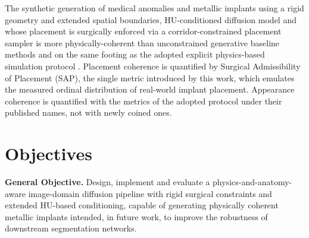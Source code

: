 \documentclass[9pt]{extarticle}
\begin{document}
The synthetic generation of medical anomalies and metallic implants using a rigid geometry and extended spatial boundaries, HU-conditioned diffusion model and whose placement is surgically enforced via a corridor-constrained placement sampler is more physically-coherent than unconstrained generative baseline methods and on the same footing as the adopted explicit physics-based simulation protocol \citep{peters2025hybrid}. Placement coherence is quantified by Surgical Admissibility of Placement (SAP), the single metric introduced by this work, which emulates the measured ordinal distribution of real-world implant placement. Appearance coherence is quantified with the metrics of the adopted protocol under their published names, not with newly coined ones.

\section{Objectives}

\textbf{General Objective.} Design, implement and evaluate a physics-and-anatomy-aware image-domain diffusion pipeline with rigid surgical constraints and extended HU-based conditioning, capable of generating physically coherent metallic implants intended, in future work, to improve the robustness of downstream segmentation networks.
\end{document}
